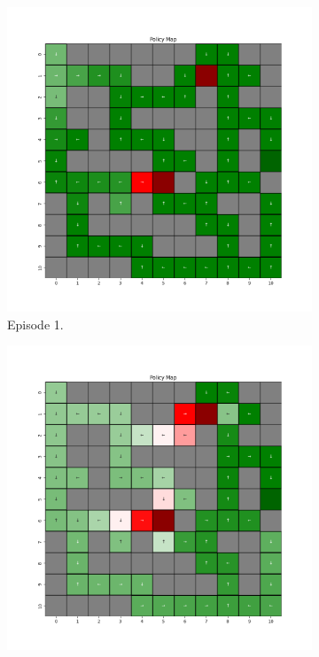 \documentclass{assignment}
\begin{document}
\begin{figure}[H]
    \begin{subfigure}{0.3\textwidth}
        \includegraphics[width=\textwidth]{figures/policy_td/epsilon_sweep/policy_alpha_0.1_gamma_0.95_epsilon_1.0_iteration_1.png}
    \caption{Episode 1.}
    \end{subfigure}\hfill
    \begin{subfigure}{0.3\textwidth}
        \includegraphics[width=\textwidth]{figures/policy_td/epsilon_sweep/policy_alpha_0.1_gamma_0.95_epsilon_1.0_iteration_50.png}

\end{subfigure}
\end{figure}
\end{document}
